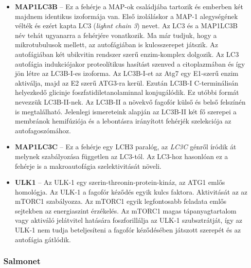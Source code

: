 \documentclass[a4paper,12pt]{article}
\begin{document}
\begin{itemize}
					\item \textbf{MAP1LC3B} -- Ez a fehérje a MAP-ok családjába tartozik és emberben két majdnem identikus izoformája van. Első izoláláskor a MAP-1 alegységének vélték és ezért kapta LC3 (\textit{lighnt chain 3}) nevet. Az LC3 és a MAP1LC3B név tehát ugyanarra a fehérjére vonatkozik. Ma már tudjuk, hogy a mikrotubulusok mellett, az autofágiában is kulcsszerepet játszik. \cite{atg8_like} Az autofágiában két ubikvitin rendszer szerű enzim-komplex dolgozik. Az LC3 autofágia indukciójakor proteolítikus hasítást szenved a citoplazmában és így jön létre az LC3B-I-es izoforma. Az LC3B-I-et az Atg7 egy E1-szerű enzim aktiválja, majd az E2 szerű ATG3-ra kerül. Ezután LC3B-I C-terminálisán helyezkedő glicinje foszfatidiletanolaminnal konjugálódik. Ez utóbbi formát nevezzük LC3B-II-nek. Az LC3B-II a növekvő fagofór külső és belső felszínén is megtalálható. Jelenlegi ismereteink alapján az LC3B-II két fő szerepei a membránok hemifúziója és a lebontásra irányított fehérjék szelekciója az autofagoszómához. \cite{autophagy_proteins}
					
					\item \textbf{MAP1LC3C} -- Ez a fehérje egy LCH3 paralóg, az \textit{LC3C} génről íródik át melynek szabályozása független az LC3-tól. Az LC3-hoz hasonlóan ez a fehérje is a makroautofágia szelektivitását növeli.\cite{atg8_like}
					
					\item \textbf{ULK1} -- Az ULK-1 egy szerin-threonin-protein-kináz, az ATG1 emlős homológja. Az ULK-1 a fagofór kéződés egyik kulcs faktora. Aktivitását az az mTORC1 szabályozza. Az mTORC1 egyik legfontosabb feladata emlős sejtekben az energiaszint érzékelés. Az mTORC1 magas tápanyagtartalom vagy aktiváló jelátvitel hatására foszforillálja az ULK-1 szubsztrátját, így az ULK-1 nem tudja beteljesíteni a fagofór kéződésében játszott szerepét és az autofágia gátlódik. \cite{autophagy_proteins}
				\end{itemize}
				
		
		\subsubsection{Salmonet}
		
\end{document}
